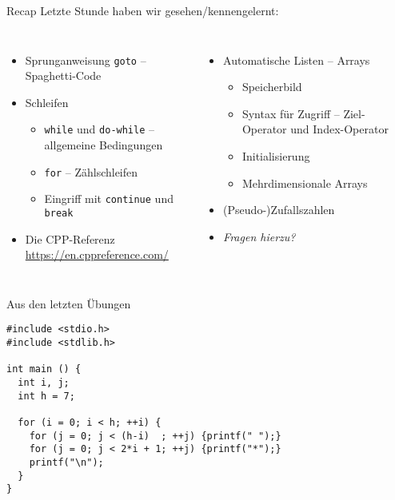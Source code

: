 
\begin{frame}[t,plain]
\titlepage
\end{frame}


\begin{frame}{Recap}
%
Letzte Stunde haben wir gesehen/kennengelernt:
%
\begin{columns}[T]
\begin{itemize}
\item Sprunganweisung \texttt{goto} -- Spaghetti-Code
\item Schleifen
	\begin{itemize}
	\item \texttt{while} und \texttt{do-while} -- allgemeine Bedingungen
	\item \texttt{for} -- Zählschleifen
	\item Eingriff mit \texttt{continue} und \texttt{break}
	\end{itemize}
\item Die CPP-Referenz \url{https://en.cppreference.com/}
\end{itemize}
%
\begin{itemize}
\item Automatische Listen -- Arrays
	\begin{itemize}
	\item Speicherbild
	\item Syntax für Zugriff -- Ziel-Operator und Index-Operator
	\item Initialisierung
	\item Mehrdimensionale Arrays
	\end{itemize}
\item (Pseudo-)Zufallszahlen
\item \emph{Fragen hierzu?}
\end{itemize}
\end{columns}
%
\end{frame}


\begin{frame}[fragile]{Aus den letzten Übungen}
%
\begin{codebox}
\begin{verbatim}
#include <stdio.h>
#include <stdlib.h>

int main () {
  int i, j;
  int h = 7;
  
  for (i = 0; i < h; ++i) {
    for (j = 0; j < (h-i)  ; ++j) {printf(" ");}
    for (j = 0; j < 2*i + 1; ++j) {printf("*");}
    printf("\n");
  }
}
\end{verbatim}
\end{codebox}
%
\end{frame}

